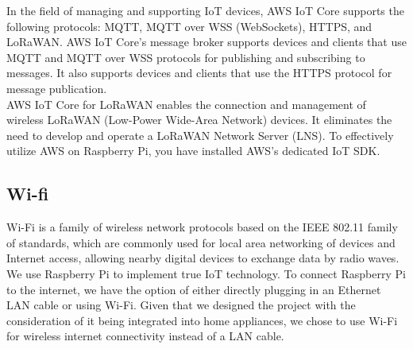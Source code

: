 In the field of managing and supporting IoT devices, AWS IoT Core supports the following protocols: MQTT, MQTT over WSS (WebSockets), HTTPS, and LoRaWAN. AWS IoT Core's message broker supports devices and clients that use MQTT and MQTT over WSS protocols for publishing and subscribing to messages. It also supports devices and clients that use the HTTPS protocol for message publication.
\\

AWS IoT Core for LoRaWAN enables the connection and management of wireless LoRaWAN (Low-Power Wide-Area Network) devices. It eliminates the need to develop and operate a LoRaWAN Network Server (LNS). To effectively utilize AWS on Raspberry Pi, you have installed AWS's dedicated IoT SDK.\\

\subsection{\textbf{Wi-fi}}
\cite{wifi} Wi-Fi is a family of wireless network protocols based on the IEEE 802.11 family of standards, which are commonly used for local area networking of devices and Internet access, allowing nearby digital devices to exchange data by radio waves. 
\\


We use Raspberry Pi to implement true IoT technology. To connect Raspberry Pi to the internet, we have the option of either directly plugging in an Ethernet LAN cable or using Wi-Fi. Given that we designed the project with the consideration of it being integrated into home appliances, we chose to use Wi-Fi for wireless internet connectivity instead of a LAN cable.\\

